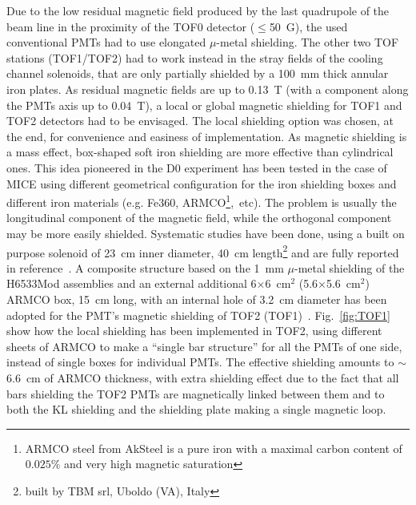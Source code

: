 Due to the low residual magnetic field produced by the last quadrupole
of the beam line in the proximity of the TOF0 detector ($\leq$50~G),
the used conventional PMTs had to use  elongated $\mu$-metal 
shielding.
The other two TOF stations (TOF1/TOF2) had to work instead in the stray fields
of the cooling channel solenoids, that are only partially shielded by a 100~mm thick
annular iron plates. As residual magnetic fields are up to 0.13~T (with a
component along the PMTs axis up to 0.04~T), a local or global
magnetic shielding for TOF1 and TOF2 detectors had to be envisaged.
The local shielding option was chosen, at the end, for convenience and 
easiness of implementation.
As magnetic shielding is a mass effect, box-shaped soft iron shielding 
are more effective than cylindrical ones. This idea pioneered in the 
D0 experiment has been tested in the case of MICE using different geometrical
configuration for the iron shielding boxes and different iron materials (e.g. Fe360, ARMCO\footnote{ARMCO steel from AkSteel is a pure iron with 
a maximal carbon content of $0.025\%$ and very high magnetic saturation},~etc).
The problem is usually the longitudinal component of the magnetic field, while the orthogonal component may be more easily shielded.
Systematic studies have been done, using a built on purpose solenoid of 23~cm inner diameter,
40~cm length\footnote{built by TBM srl, Uboldo (VA), Italy} and are fully reported in reference~\cite{2012NIMPA.693..130B}. 
A composite structure based on the 1~mm $\mu$-metal shielding
of the H6533Mod assemblies and an external  
additional 6$\times$6~cm$^2$ (5.6$\times$5.6~cm$^2$) ARMCO box, 15~cm long, with an
internal hole of 3.2~cm diameter has been adopted for the PMT's magnetic 
shielding of TOF2 (TOF1)~\cite{NOTE455}.
Fig.~\ref{fig:TOF1} show how the local shielding has been 
implemented in TOF2, using different sheets of ARMCO to make a ``single bar structure'' 
for all the PMTs of one side, instead of single boxes for individual PMTs. The effective shielding amounts to $\sim$6.6~cm of ARMCO 
thickness, with extra shielding effect due to the fact that all bars shielding 
the TOF2 PMTs are magnetically linked between them and to both the KL shielding
and the shielding  plate making a single magnetic loop. 

